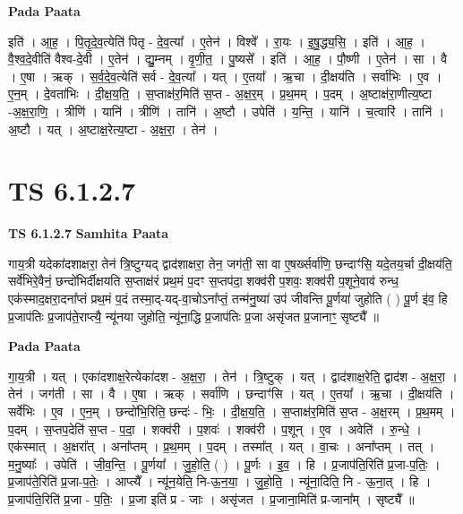 \documentclass[17pt]{extarticle}
\begin{document}
\textbf{Pada Paata} \newline

इति॑ । आ॒ह॒ । पि॒तृ॒दे॒व॒त्येति॑ पितृ - दे॒व॒त्या᳚ । ए॒तेन॑ । विश्वे᳚ । रा॒यः । इ॒षु॒द्ध्य॒सि॒ । इति॑ । आ॒ह॒ । वै॒श्व॒दे॒वीति॑ वैश्व-दे॒वी । ए॒तेन॑ । द्यु॒म्नम् । वृ॒णी॒त॒ । पु॒ष्यसे᳚ । इति॑ । आ॒ह॒ । पौ॒ष्णी । ए॒तेन॑ । सा । वै । ए॒षा । ऋक् । स॒र्व॒दे॒व॒त्येति॑ सर्व - दे॒व॒त्या᳚ । यत् । ए॒तया᳚ । ऋ॒चा । दी॒क्षय॑ति । सर्वा॑भिः । ए॒व । ए॒न॒म् । दे॒वता॑भिः । दी॒क्ष॒य॒ति॒ । स॒प्ताक्ष॑र॒मिति॑ स॒प्त - अ॒क्ष॒र॒म् । प्र॒थ॒मम् । प॒दम् । अ॒ष्टाक्ष॑रा॒णीत्य॒ष्टा -अ॒क्ष॒रा॒णि॒ । त्रीणि॑ । यानि॑ । त्रीणि॑ । तानि॑ । अ॒ष्टौ । उपेति॑ । य॒न्ति॒ । यानि॑ । च॒त्वारि॑ । तानि॑ । अ॒ष्टौ । यत् । अ॒ष्टाक्ष॒रेत्य॒ष्टा - अ॒क्ष॒रा॒ । तेन॑ ।  \newline




\section*{ TS 6.1.2.7 }

\textbf{TS 6.1.2.7 } \newline
\textbf{Samhita Paata} \newline

गाय॒त्री यदेका॑दशाक्षरा॒ तेन॑ त्रि॒ष्टुग्यद् द्वाद॑शाक्षरा॒ तेन॒ जग॑ती॒ सा वा ए॒षर्ख्सर्वा॑णि॒ छन्दाꣳ॑सि॒ यदे॒तय॒र्चा दी॒क्षय॑ति॒ सर्वे॑भिरे॒वैनं॒ छन्दो॑भिर्दीक्षयति स॒प्ताक्ष॑रं प्रथ॒मं प॒दꣳ स॒प्तप॑दा॒ शक्व॑री प॒शवः॒ शक्व॑री प॒शूने॒वाव॑ रुन्ध॒ एक॑स्माद॒क्षरा॒दना᳚प्तं प्रथ॒मं प॒दं तस्मा॒द्-यद्-वा॒चोऽना᳚प्तं॒ तन्म॑नु॒ष्या॑ उप॑ जीवन्ति पू॒र्णया॑ जुहोति ( ) पू॒र्ण इ॑व॒ हि प्र॒जाप॑तिः प्र॒जाप॑ते॒राप्त्यै॒ न्यू॑नया जुहोति॒ न्यू॑ना॒द्धि प्र॒जाप॑तिः प्र॒जा असृ॑जत प्र॒जानाꣳ॒॒ सृष्ट्यै᳚ ॥ \newline

\textbf{Pada Paata} \newline

गा॒य॒त्री । यत् । एका॑दशाक्ष॒रेत्येका॑दश - अ॒क्ष॒रा॒ । तेन॑ । त्रि॒ष्टुक् । यत् । द्वाद॑शाक्ष॒रेति॒ द्वाद॑श - अ॒क्ष॒रा॒ । तेन॑ । जग॑ती । सा । वै । ए॒षा । ऋक् । सर्वा॑णि । छन्दाꣳ॑सि । यत् । ए॒तया᳚ । ऋ॒चा । दी॒क्षय॑ति । सर्वे॑भिः । ए॒व । ए॒न॒म् । छन्दो॑भि॒रिति॒ छन्दः॑ - भिः॒ । दी॒क्ष॒य॒ति॒ । स॒प्ताक्ष॑र॒मिति॑ स॒प्त - अ॒क्ष॒रम् । प्र॒थ॒मम् । प॒दम् । स॒प्तप॒देति॑ स॒प्त - प॒दा॒ । शक्व॑री । प॒शवः॑ । शक्व॑री । प॒शून् । ए॒व । अवेति॑ । रु॒न्धे॒ । एक॑स्मात् । अ॒क्षरा᳚त् । अना᳚प्तम् । प्र॒थ॒मम् । प॒दम् । तस्मा᳚त् । यत् । वा॒चः । अना᳚प्तम् । तत् । म॒नु॒ष्याः᳚ । उपेति॑ । जी॒व॒न्ति॒ । पू॒र्णया᳚ । जु॒हो॒ति॒ ( ) । पू॒र्णः । इ॒व॒ । हि । प्र॒जाप॑ति॒रिति॑ प्र॒जा-प॒तिः॒ । प्र॒जाप॑ते॒रिति॑ प्र॒जा-प॒तेः॒ । आप्त्यै᳚ । न्यू॑न॒येति॒ नि-ऊ॒न॒या॒ । जु॒हो॒ति॒ । न्यू॑ना॒दिति॒ नि - ऊ॒ना॒त् । हि । प्र॒जाप॑ति॒रिति॑ प्र॒जा - प॒तिः॒ । प्र॒जा इति॑ प्र - जाः । असृ॑जत । प्र॒जाना॒मिति॑ प्र-जाना᳚म् । सृष्ट्यै᳚ ॥  \newline
\end{document}
